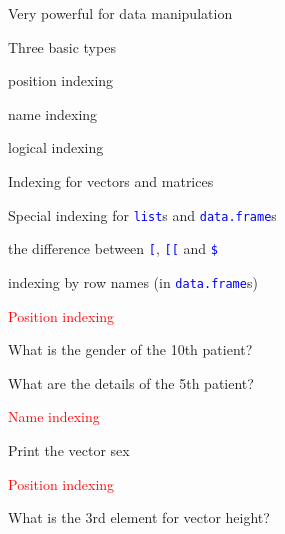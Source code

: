 \documentclass{presentatiesmetlogo}
\newcommand{\code}[1]{\textcolor{blue}{\texttt{#1}}}
\let \nl = \newline
\begin{document}
\bitem
\item Very powerful for data manipulation
\nl
\item Three basic types
\bitemt
\item position indexing
\item name indexing
\item logical indexing
\eitemt
\eitem
\bitem
\item Indexing for vectors and matrices
\nl
\item Special indexing for \code{list}s and \code{data.frame}s
\bitemt
\item the difference between \code{[}, \code{[[} and \code{\$}
\item indexing by row names (in \code{data.frame}s)
\nl
\eitemt
\eitem
\bitem
\item \textcolor{red}{Position indexing}
\bitemt
\item {}
\item What is the gender of the 10th patient?
\item What are the details of the 5th patient?
\nl
\eitemt
\item \textcolor{red}{Name indexing}
\bitemt
\item Print the vector sex
\eitemt
\eitem
\bitem
\item \textcolor{red}{Position indexing}
\bitemt
\item What is the 3rd element for vector height?
\end{document}
